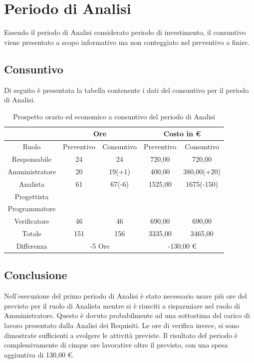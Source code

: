 \documentclass[./PianodiProgetto.tex]{subfiles}
\begin{document}
\section{Periodo di Analisi}
Essendo il periodo di Analisi considerato periodo di investimento, il consuntivo viene presentato a scopo informativo ma non conteggiato nel preventivo a finire.
\subsection{Consuntivo}
Di seguito è presentata la tabella contenente i dati del consuntivo per il
periodo di Analisi.

\begin{table}[H]
	\centering
	\begin{tabular}{|c|c|c|c|c|}
		\hline
	 	 & \multicolumn{2}{c|}{Ore} & \multicolumn{2}{c|}{Costo in \euro{}}  \\ \hline
		Ruolo&Preventivo&Consuntivo&Preventivo&Consuntivo \\ \hline
		Responsabile&24&24&720,00&720,00  \\ \hline
		Amministratore&20&19(+1)&400,00&380,00(+20)  \\ \hline
		Analista&61&67(-6)&1525,00&1675(-150)  \\ \hline
		Progettista& & & &  \\ \hline
		Programmatore& & & &  \\ \hline
		Verificatore&46&46&690,00&690,00  \\ \hline
		Totale&151&156&3335,00&3465,00  \\ \hline
		Differenza& \multicolumn{2}{c|}{-5 Ore} & \multicolumn{2}{c|}{-130,00 \euro{}} \\ \hline
	\end{tabular}
	\caption{Prospetto orario ed economico a consuntivo del periodo di Analisi}
\end{table}

\subsection{Conclusione}
Nell'esecuzione del primo periodo di Analisi è stato necessario usare più
ore del previsto per il ruolo di Analista mentre si è riusciti a risparmiare nel ruolo di Amministratore. Questo è dovuto
probabilmente ad una sottostima del carico di lavoro presentato dalla Analisi
dei Requisiti. Le ore di verifica invece, si sono dimostrate sufficienti a svolgere
le attività previste. Il risultato del periodo è complessivamente di cinque ore
lavorative oltre il previsto, con una spesa aggiuntiva di 130,00 \euro{}.
\end{document}
